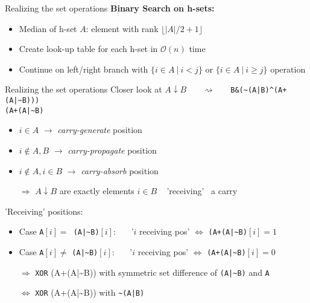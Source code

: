 \documentclass[18pt]{beamer}
\begin{document}
\appendix
\begin{frame}{Realizing the set operations}
\textbf{Binary Search on h-sets:}
\begin{itemize}
	\item Median of h-set $A$:  element with rank $\lfloor|A|/2 + 1\rfloor$
	\item Create look-up table for each h-set in $\mathcal{O}(n)$ time
	\item Continue on left/right branch with $\{i \in A \ | \ i < j\}$ or $\{i \in A  \ | \ i \ge j\}$ operation
\end{itemize}
\end{frame}
 \begin{frame}{Realizing the set operations}
Closer look at $A \downarrow B$ \ \ \ $\rightsquigarrow$ \ \ \  \texttt{B\&(\textasciitilde(A|B)\^{}(A+(A|\textasciitilde B)))} \\
\bigskip 
{\color{blue} \texttt{(A+(A|\textasciitilde B)}}
\begin{itemize}
	\item $i \in A$ $\rightarrow$ \emph{carry-generate} position
	\item $i \notin A,B$ $\rightarrow$ \emph{carry-propagate} position
	\item $i \notin A, i \in B$ $\rightarrow$ \emph{carry-absorb} position
	\item [$\Rightarrow$] $A \downarrow B$ are exactly elements $i \in B$ \ {\color{blue} 'receiving'} \ a carry
\end{itemize}
\bigskip
\pause
'Receiving' positions:
\begin{itemize}
	\item Case \texttt{A}$[i] = $\ \texttt{(A|\textasciitilde B)}$[i]$: \ \ \ '$i$ receiving pos' $\Leftrightarrow$ \texttt{(A+(A|\textasciitilde B)}$[i] = 1$
	\item Case \texttt{A}$[i] \neq$ \texttt{(A|\textasciitilde B)}$[i]$: \ \ \ '$i$ receiving pos' $\Leftrightarrow$ \texttt{(A+(A|\textasciitilde B)}$[i] = 0$
	\item [$\Rightarrow$] \texttt{XOR} (A+(A|\textasciitilde B)) with symmetric set difference of \texttt{(A|\textasciitilde B)} and \texttt{A}
	\item [$\Leftrightarrow$] \texttt{XOR} (A+(A|\textasciitilde B)) with \texttt{\textasciitilde(A|B)}
\end{itemize}
\end{frame}
\end{document}
